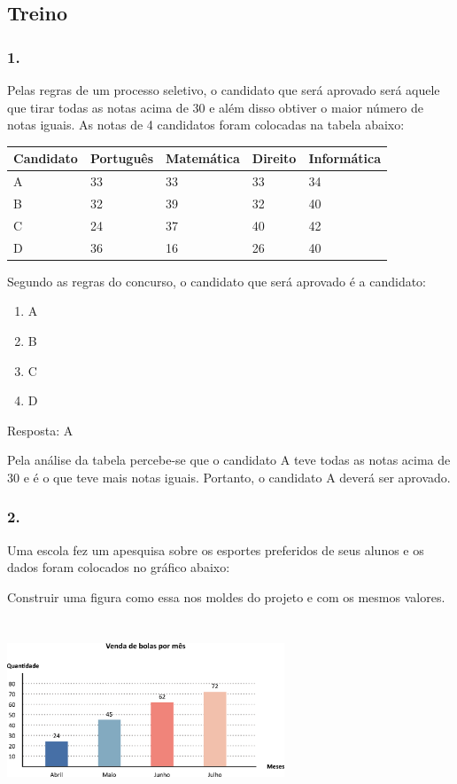 \subsection{Treino}\label{treino-7}

\subsubsection{1.}\label{section-123}

Pelas regras de um processo seletivo, o candidato que será aprovado será
aquele que tirar todas as notas acima de 30 e além disso obtiver o maior
número de notas iguais. As notas de 4 candidatos foram colocadas na
tabela abaixo:

\begin{longtable}[]{@{}lllll@{}}
\toprule
Candidato & Português & Matemática & Direito &
Informática\tabularnewline
\midrule
\endhead
A & 33 & 33 & 33 & 34\tabularnewline
B & 32 & 39 & 32 & 40\tabularnewline
C & 24 & 37 & 40 & 42\tabularnewline
D & 36 & 16 & 26 & 40\tabularnewline
\bottomrule
\end{longtable}

Segundo as regras do concurso, o candidato que será aprovado é a
candidato:

\begin{enumerate}
\def\labelenumi{\alph{enumi})}
\item
  A
\item
  B
\item
  C
\item
  D
\end{enumerate}

Resposta: A

Pela análise da tabela percebe-se que o candidato A teve todas as notas
acima de 30 e é o que teve mais notas iguais. Portanto, o candidato A
deverá ser aprovado.

\subsubsection{2.}\label{section-124}

Uma escola fez um apesquisa sobre os esportes preferidos de seus alunos
e os dados foram colocados no gráfico abaixo:

Construir uma figura como essa nos moldes do projeto e com os mesmos
valores.

\includegraphics[width=3.25862in,height=2.14185in]{media/image105.png}

